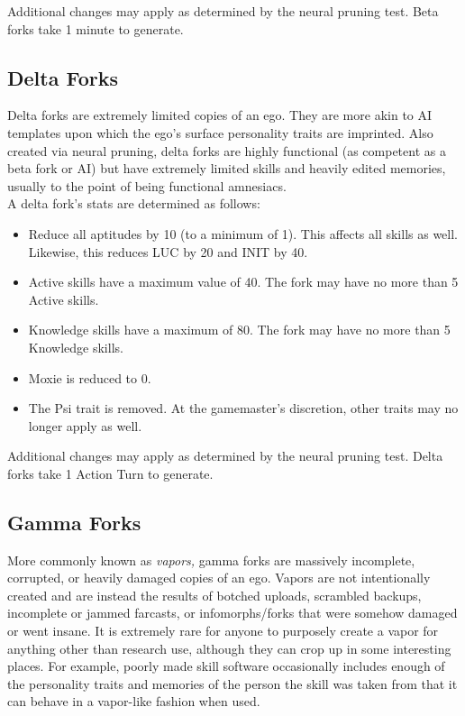 Additional changes may apply as determined by 
the neural pruning test. Beta forks take 1 minute 
to generate.

\subsection{Delta Forks}

Delta forks are extremely limited copies of an ego. 
They are more akin to AI templates upon which 
the ego's surface personality traits are imprinted. 
Also created via neural pruning, delta forks are 
highly functional (as competent as a beta fork or 
AI) but have extremely limited skills and heavily
edited memories, usually to the point of being
functional amnesiacs. \\
A delta fork's stats are determined as follows:

\begin{itemize}
\item Reduce all aptitudes by 10 (to a minimum of 1). 
This affects all skills as well. Likewise, this reduces
LUC by 20 and INIT by 40.
\item Active skills have a maximum value of 40. The 
fork may have no more than 5 Active skills.
\item Knowledge skills have a maximum of 80. The 
fork may have no more than 5 Knowledge skills.
\item Moxie is reduced to 0.
\item The Psi trait is removed. At the gamemaster's discretion, other traits may no longer apply as well.
\end{itemize}

Additional changes may apply as determined by the 
neural pruning test. Delta forks take 1 Action Turn 
to generate.

\subsection{Gamma Forks}

More commonly known as \textit{vapors,} gamma forks are 
massively incomplete, corrupted, or heavily damaged 
copies of an ego. Vapors are not intentionally created
and are instead the results of botched uploads,
scrambled backups, incomplete or jammed farcasts, 
or infomorphs/forks that were somehow damaged or 
went insane. It is extremely rare for anyone to purposely
create a vapor for anything other than research
use, although they can crop up in some interesting 
places. For example, poorly made skill software occasionally
includes enough of the personality traits and
memories of the person the skill was taken from that 
it can behave in a vapor-like fashion when used.

